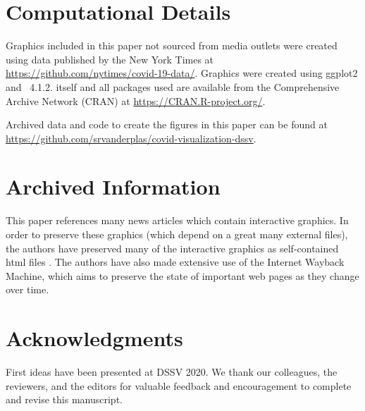 \documentclass[article]{jdssv}\usepackage[]{graphicx}\usepackage[]{xcolor}
\begin{document}

\newpage
\section*{Computational Details}
Graphics included in this paper not sourced from media outlets were created using data published by the New York Times at \url{https://github.com/nytimes/covid-19-data/}. Graphics were created using ggplot2\citep{ggplot2} and ~4.1.2.  itself and all packages used are available from the Comprehensive  Archive Network (CRAN) at \url{https://CRAN.R-project.org/}.

Archived data and code to create the figures in this paper can be found at \url{https://github.com/srvanderplas/covid-visualization-dssv}.

\section*{Archived Information}
This paper references many news articles which contain interactive graphics. In order to preserve these graphics (which depend on a great many external files), the authors have preserved many of the interactive graphics as self-contained html files \citep{news-file-archive}. 
The authors have also made extensive use of the Internet Wayback Machine, which aims to preserve the state of important web pages as they change over time.

\section*{Acknowledgments}

First ideas have been presented at DSSV 2020. We thank our colleagues, the reviewers, and the editors for valuable feedback and encouragement to complete and revise this manuscript.

\end{document}
